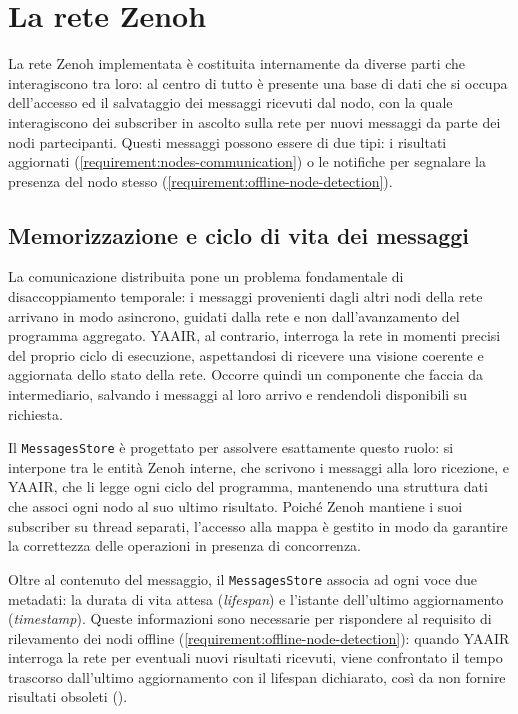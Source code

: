 \section{La rete Zenoh}
\label{sec:zenoh-network}

La rete Zenoh implementata è costituita internamente da diverse parti che
interagiscono tra loro: al centro di tutto è presente una base di dati che si
occupa dell'accesso ed il salvataggio dei messaggi ricevuti dal nodo, con la
quale interagiscono dei subscriber in ascolto sulla rete per nuovi messaggi da parte
dei nodi partecipanti.
Questi messaggi possono essere di due tipi: i risultati aggiornati (\ref{requirement:nodes-communication})
o le notifiche per segnalare la presenza del nodo stesso (\ref{requirement:offline-node-detection}).

\subsection{Memorizzazione e ciclo di vita dei messaggi}
\label{ssec:messages-life-cycle}

La comunicazione distribuita pone un problema fondamentale di disaccoppiamento
temporale: i messaggi provenienti dagli altri nodi della rete arrivano in modo
asincrono, guidati dalla rete e non dall'avanzamento del programma aggregato.
\ac{YAAIR}, al contrario, interroga la rete in momenti precisi del proprio ciclo
di esecuzione, aspettandosi di ricevere una visione coerente e aggiornata dello
stato della rete. Occorre quindi un componente che faccia da intermediario,
salvando i messaggi al loro arrivo e rendendoli disponibili su richiesta.

Il \texttt{MessagesStore} è progettato per assolvere esattamente questo ruolo:
si interpone tra le entità Zenoh interne, che scrivono i messaggi alla loro
ricezione, e \ac{YAAIR}, che li legge ogni ciclo del programma, mantenendo una
struttura dati che associ ogni nodo al suo ultimo risultato. Poiché Zenoh mantiene
i suoi subscriber su thread separati, l'accesso alla mappa è gestito in modo da
garantire la correttezza delle operazioni in presenza di concorrenza.

Oltre al contenuto del messaggio, il \texttt{MessagesStore} associa ad ogni voce
due metadati: la durata di vita attesa (\emph{lifespan}) e l'istante dell'ultimo
aggiornamento (\emph{timestamp}). Queste informazioni sono necessarie per rispondere
al requisito di rilevamento dei nodi offline (\ref{requirement:offline-node-detection}):
quando \ac{YAAIR} interroga la rete per eventuali nuovi risultati ricevuti, viene
confrontato il tempo trascorso dall'ultimo aggiornamento con il lifespan dichiarato,
così da non fornire risultati obsoleti ().


